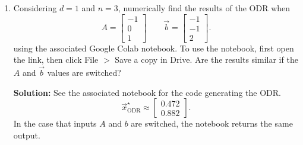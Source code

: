 \documentclass[10pt]{article}
\DeclareMathOperator*{\argmax}{argmax}
\begin{document}
\begin{enumerate}[label=(\alph*), start=5]
Note that the second line follows because we enforce in our optimization that $\vec{x}$ is unit norm, and thus $\vec{x}^\top \vec{x} = 1$. The solution is the eigenvector corresponding to the largest eigenvalue of $H$:
\begin{align}
\argmax_{\vec{x},\|\vec{x}\|_2=1} \vec{x}^\top H \vec{x}
&= \argmax_{\vec{x},\|\vec{x}\|_2=1} \vec{x}^\top U \Lambda U^\top \vec{x} \\
&= \argmax_{\vec{x},\|\vec{x}\|_2=1} \sum_{j=1}^{d+1} (\vec{x}^\top \vec{u}_i) \lambda_i (\vec{u}_i^\top \vec{x}) \\
&\leq \argmax_{\vec{x},\|\vec{x}\|_2=1} \lambda_1 \sum_{j=1}^{d+1} (\vec{x}^\top \vec{u}_i)(\vec{u}_i^\top \vec{x}) \\
&= \argmax_{\vec{x},\|\vec{x}\|_2=1} \lambda_1 \vec{x}^\top U U^\top \vec{x} \\
&= \argmax_{\vec{x},\|\vec{x}\|_2=1} \lambda_1 \left\| U^\top \vec{x} \right\|^2 \\
&= \lambda_1.
\end{align}

We know that $\vec{u}_1^\top H \vec{u}_1 = \lambda_1$, so $\vec{u}_1 \in \argmax_{\vec{x},\|\vec{x}\|_2=1} \vec{x}^\top H \vec{x}$.

Note that $H = Z^\top Z$, so $u_1$ is also a right singular vector of $Z$ associated with the largest singular value of $Z$.

\item Considering $d = 1$ and $n = 3$, numerically find the results of the ODR when
\begin{equation}
A = \begin{bmatrix} -1 \\ 0 \\ 1 \end{bmatrix} \qquad \vec{b} = \begin{bmatrix} -1 \\ -1 \\ 2 \end{bmatrix}.
\end{equation}
using the associated Google Colab notebook. To use the notebook, first open the link, then click File $>$ Save a copy in Drive. Are the results similar if the $A$ and $\vec{b}$ values are switched?

\textbf{Solution:} See the associated notebook for the code generating the ODR.
\begin{equation}
\vec{x}^\star_{\text{ODR}} \approx \begin{bmatrix} 0.472 \\ 0.882 \end{bmatrix}.
\end{equation}
In the case that inputs $A$ and $b$ are switched, the notebook returns the same output.


\end{enumerate}
\end{document}
